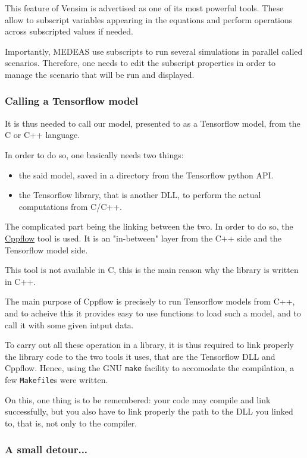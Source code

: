 This feature of Vensim is advertised as one of its most powerful tools. These allow to subscript variables appearing in the equations and perform operations across subscripted values if needed.  

Importantly, MEDEAS use subscripts to run several simulations in parallel called scenarios. Therefore, one needs to edit the subscript properties in order to manage the scenario that will be run and displayed.

\subsubsection{Calling a Tensorflow model}

It is thus needed to call our model, presented to as a Tensorflow model, from the C or C++ language.

In order to do so, one basically needs two things:
\begin{itemize}
    \item the said model, saved in a directory from the Tensorflow python API.
    \item the Tensorflow library, that is another DLL, to perform the actual computations from C/C++.
\end{itemize}

The complicated part being the linking between the two. In order to do so, the \href{https://serizba.github.io/cppflow/}{Cppflow} tool is used. It is an "in-between" layer from the C++ side and the Tensorflow model side.

This tool is not available in C, this is the main reason why the library is written in C++.

The main purpose of Cppflow is precisely to run Tensorflow models from C++, and to acheive this it provides easy to use functions to load such a model, and to call it with some given intput data.

To carry out all these operation in a library, it is thus required to link properly the library code to the two tools it uses, that are the Tensorflow DLL and Cppflow. Hence, using the GNU \texttt{make} facility to accomodate the compilation, a few \texttt{Makefile}s were written.

On this, one thing is to be remembered: your code may compile and link successfully, but you also have to link properly the path to the DLL you linked to, that is, not only to the compiler.

\subsubsection{A small detour...}

